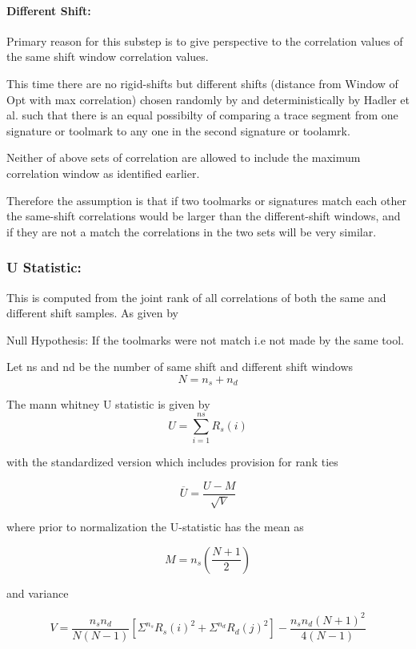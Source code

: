 \documentclass[12pt]{article}
\begin{document}
\paragraph{Different Shift:}\label{different-shift}

Primary reason for this substep is to give perspective to the
correlation values of the same shift window correlation values.

This time there are no rigid-shifts but different shifts (distance from
Window of Opt with max correlation) chosen randomly by \citet{chumbley}
and deterministically by Hadler et al. such that there is an equal
possibilty of comparing a trace segment from one signature or toolmark
to any one in the second signature or toolamrk.

Neither of above sets of correlation are allowed to include the maximum
correlation window as identified earlier.

Therefore the assumption is that if two toolmarks or signatures match
each other the same-shift correlations would be larger than the
different-shift windows, and if they are not a match the correlations in
the two sets will be very similar.

\subsubsection{U Statistic:}\label{u-statistic}

This is computed from the joint rank of all correlations of both the
same and different shift samples. As given by \citet{hadler}

Null Hypothesis: If the toolmarks were not match i.e not made by the
same tool.

Let ns and nd be the number of same shift and different shift windows
\[N = n_{s} + n_{d}\]

The mann whitney U statistic is given by
\[U =\sum^{ns}_{i=1}R_{s}\left( i\right)\]

with the standardized version which includes provision for rank ties

\[\overline{U}= \dfrac{U-M}{\sqrt{V}}\]

where prior to normalization the U-statistic has the mean as

\[M = n_{s}\left(\dfrac{N+1}{2}\right)\]

and variance

\[V = \dfrac{n_{s}n_{d}}{N\left(N-1\right)}\left[\Sigma^{n_{s}}R_{s}\left(i\right)^{2}+\Sigma^{n_{d}}R_{d}\left(j\right)^{2}\right] -\dfrac{n_{s} n_{d}\left(N+1\right)^{2}}{4\left(N-1\right)}\]
\end{document}
